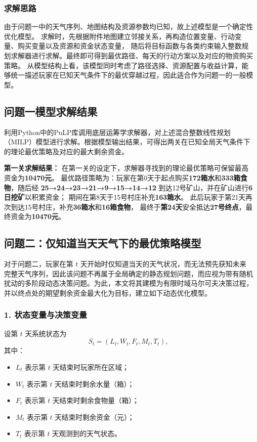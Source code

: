\documentclass[UTF8,a4paper,12pt]{ctexart}
\begin{document}
\subsubsection{求解思路}

由于问题一中的天气序列、地图结构及资源参数均已知，故上述模型是一个确定性优化模型。
求解时，先根据附件地图建立邻接关系，再构造位置变量、行动变量、购买变量以及资源和资金状态变量，
随后将目标函数与各类约束输入整数规划求解器进行求解。最终即可得到最优路径、每天的行动方案以及对应的物资购买策略。
从模型结构上看，该模型同时考虑了路径选择、资源配置与收益计算，能够统一描述玩家在已知天气条件下的最优穿越过程，因此适合作为问题一的一般模型。

\subsection{问题一模型求解结果}

利用Python中的PuLP库调用底层运筹学求解器，对上述混合整数线性规划（MILP）模型进行求解。根据模型输出结果，可得出两关在已知全局天气条件下的理论最优策略及对应的最大剩余资金。

\textbf{第一关求解结果：}  
在第一关的设定下，求解器寻找到的理论最优策略可保留最高资金为\textbf{10470元}。
最优路径策略为：玩家在第0天于起点购买\textbf{172箱水}和\textbf{333箱食物}，随后经  
\textbf{25→24→23→21→9→15→14→12}  
到达12号矿山，并在矿山进行\textbf{6日挖矿}以积累资金；
期间在第8天于15号村庄补充\textbf{163箱水}。
此后玩家于第21天再次到达15号村庄，补充\textbf{36箱水}和\textbf{16箱食物}，
最终于\textbf{第24天}安全抵达\textbf{27号终点}，最终资金为\textbf{10470元}。



\subsection{问题二：仅知道当天天气下的最优策略模型}

对于问题二，玩家在第 $t$ 天开始时仅知道当天的天气状况，而无法预先获知未来完整天气序列，因此该问题不再属于全局确定的静态规划问题，而应视为带有随机扰动的多阶段动态决策问题。为此，本文将其建模为有限时域马尔可夫决策过程，并以终点处的期望剩余资金最大化为目标，建立如下动态优化模型。

\subsubsection*{1. 状态变量与决策变量}

设第 $t$ 天系统状态为
\[
S_t=(L_t,W_t,F_t,M_t,T_t),
\]
其中：
\begin{itemize}
    \item $L_t$ 表示第 $t$ 天结束时玩家所在区域；
    \item $W_t$ 表示第 $t$ 天结束时剩余水量（箱）；
    \item $F_t$ 表示第 $t$ 天结束时剩余食物量（箱）；
    \item $M_t$ 表示第 $t$ 天结束时剩余资金（元）；
    \item $T_t$ 表示第 $t$ 天观测到的天气状态。
\end{itemize}
\end{document}
